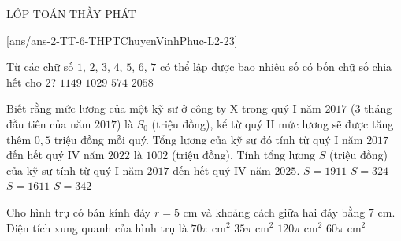 \begin{name}
	{\tenchude}{\tendethi}{LỚP TOÁN THẦY PHÁT}{\thoigian}
\end{name}
	\setcounter{ex}{0}\setcounter{bt}{0}
	[ans/ans-2-TT-6-THPTChuyenVinhPhuc-L2-23]
	
\begin{ex}%
	Từ các chữ số $1$, $2$, $3$, $4$, $5$, $6$, $7$ có thể lập được bao nhiêu số có bốn chữ số chia hết cho $2$?
	\choice
	{$1149$}
	{\True $1029$}
	{$574$}
	{$2058$}
\end{ex}

\begin{ex}%
	Biết rằng mức lương của một kỹ sư ở công ty X trong quý I năm $2017$ ($3$ tháng đầu tiên của năm $2017$) là $S_0$ (triệu đồng), kể từ quý II mức lương sẽ được tăng thêm $0,5$ triệu đồng mỗi quý. Tổng lương của kỹ sư đó tính từ quý I năm $2017$ đến hết quý IV năm $2022$ là $1002$ (triệu đồng). Tính tổng lương $S$ (triệu đồng) của kỹ sư tính từ quý I năm $2017$ đến hết quý IV năm $2025$.
	\choice
	{$S=1911$}
	{$S=324$}
	{\True $S=1611$}
	{$S=342$}
\end{ex}

\begin{ex}%
	Cho hình trụ có bán kính đáy $r=5$ cm và khoảng cách giữa hai đáy bằng $7$ cm. Diện tích xung quanh của hình trụ là
	\choice
	{\True $70\pi$ cm$^2$}
	{$35\pi$ cm$^2$}
	{$120 \pi$ cm$^2$}
	{$60 \pi$ cm$^2$}
\end{ex}

